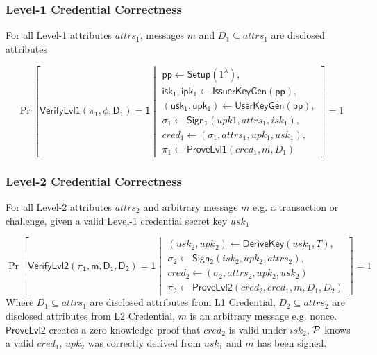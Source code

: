 \subsubsection{Level-1 Credential Correctness}
For all Level-1 attributes $attrs_1$, messages $m$ and $D_1 \subseteq attrs_1$ are disclosed attributes

\[
        \Pr
            \left [
                \mathsf{VerifyLvl1(\pi_1, \phi, D_1) = 1} \middle|
                \begin{array}{l}
                    \mathsf{pp} \gets \mathsf{Setup}(1^{\lambda}), \\
                    \mathsf{isk_1, ipk_1} \gets \mathsf{IssuerKeyGen(pp)}, \\
                    \mathsf{(usk_1, upk_1)} \gets \mathsf{UserKeyGen(pp)}, \\
                    \sigma_1 \gets \mathsf{Sign_1}(upk1, attrs_1, isk_1), \\
                    cred_1 \gets (\sigma_1, attrs_1, upk_1, usk_1), \\
                    \pi_1 \gets \mathsf{ProveLvl1}(cred_1, m, D_1)
                \end{array}
                \right ]
                 = 1
\]



\subsubsection{Level-2 Credential Correctness}
For all Level-2 attributes $attrs_2$ and arbitrary message $m$ e.g. a transaction or challenge, given a valid Level-1 credential secret key $usk_1$

\[
        \Pr
            \left [
                \mathsf{VerifyLvl2(\pi_1, m, D_1, D_2) = 1} \middle|
                \begin{array}{l}
                    (usk_2, upk_2) \gets \mathsf{DeriveKey}(usk_1, T), \\
                    \sigma_2 \gets \mathsf{Sign_2}(isk_2, upk_2, attrs_2), \\
                    cred_2 \gets (\sigma_2, attrs_2, upk_2, usk_2) \\
                    \pi_2 \gets \mathsf{ProveLvl2}(cred_2, cred_1, m, D_1, D_2)
                \end{array}
                \right ]
                 = 1
\]
Where $D_1 \subseteq attrs_1$ are disclosed attributes from L1 Credential, $D_2 \subseteq attrs_2$ are disclosed attributes from L2 Credential, $m$ is an arbitrary message e.g. nonce. $\mathsf{ProveLvl2}$ creates a zero knowledge proof that $cred_2$ is valid under $isk_2$, $\mathcal{P}$ knows a valid $cred_1$, $upk_2$ was correctly derived from $usk_1$ and $m$ has been signed.

